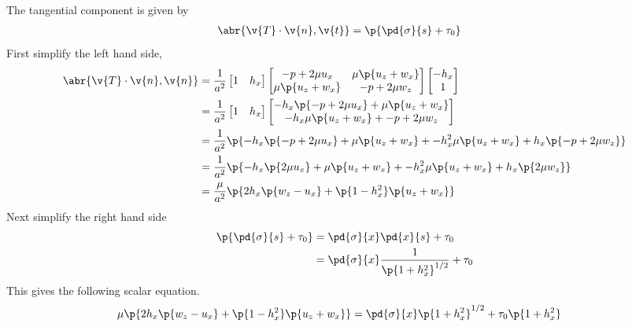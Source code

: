  The tangential component is given by
  \begin{align}
    \abr{\v{T} \cdot \v{n}, \v{t}} &= \p{\pd{\sigma}{s} + \tau_0}
  \end{align}
  First simplify the left hand side,
  \begin{align*}
    \abr{\v{T} \cdot \v{n}, \v{n}} &= \frac{1}{a^2}
    \begin{bmatrix}
      1 & h_x
    \end{bmatrix}
    \begin{bmatrix}
      -p + 2 \mu u_x & \mu \p{u_z + w_x} \\
      \mu \p{u_z + w_x} & -p + 2 \mu w_z
    \end{bmatrix}
    \begin{bmatrix}
      -h_x \\
      1
    \end{bmatrix} \\
    &=
    \frac{1}{a^2}
    \begin{bmatrix}
      1 & h_x
    \end{bmatrix}
    \begin{bmatrix}
      -h_x \p{-p + 2 \mu u_x} + \mu \p{u_z + w_x} \\
      -h_x \mu \p{u_z + w_x} + -p + 2\mu w_z
    \end{bmatrix} \\
    &= \frac{1}{a^2} \p{-h_x \p{-p + 2 \mu u_x} + \mu \p{u_z + w_x}
      + -h_x^2 \mu \p{u_z + w_x} + h_x \p{-p + 2\mu w_z}} \\
    &= \frac{1}{a^2} \p{-h_x \p{2 \mu u_x} + \mu \p{u_z + w_x}
      + -h_x^2 \mu \p{u_z + w_x} + h_x \p{2\mu w_z}} \\
    &= \frac{\mu}{a^2} \p{2 h_x \p{w_z - u_x} + \p{1 - h_x^2} \p{u_z + w_x}}
  \end{align*}
  Next simplify the right hand side
  \begin{align*}
    \p{\pd{\sigma}{s} + \tau_0} &= \pd{\sigma}{x} \pd{x}{s} + \tau_0\\
    &= \pd{\sigma}{x} \frac{1}{\p{1 + h_x^2}^{1/2}} + \tau_0
  \end{align*}
  This gives the following scalar equation.
  \begin{align}
    \mu \p{2 h_x \p{w_z - u_x} + \p{1 - h_x^2} \p{u_z + w_x}} &= \pd{\sigma}{x} \p{1 + h_x^2}^{1/2} + \tau_0\p{1 + h_x^2}
  \end{align}

